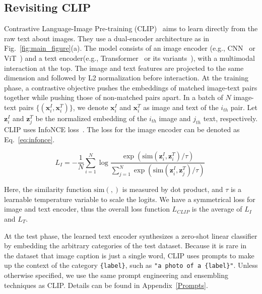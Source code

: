 \subsection{Revisiting CLIP}

Contrastive Language-Image Pre-training (CLIP)~\citep{radford2021learning} aims to learn directly from the raw text about images. They use a dual-encoder architecture as in Fig.~\ref{fig:main_figure}(a). 
The model consists of an image encoder (e.g., CNN~\citep{he2016deep} or ViT~\citep{dosovitskiy2020image}) and a text encoder(e.g., Transformer~\citep{vaswani2017attention} or its variants~\citep{radford2019language}), with a multimodal interaction at the top. 
The image and text features are projected to the same dimension and followed by L2 normalization before interaction.
At the training phase, a contrastive objective pushes the embeddings of matched image-text pairs together while pushing those of non-matched pairs apart. 
In a batch of $N$ image-text pairs ${\{(\bm x_i^I, \bm x_i^T)\}}$, we denote $\bm x_i^I$ and $\bm x_i^T$ as image and text of the $i_{th}$ pair. Let $\bm z_i^I$ and $\bm z_j^T$ be the normalized embedding of the $i_{th}$ image and $j_{th}$ text, respectively. CLIP uses InfoNCE loss~\citep{oord2018representation}. The loss for the image encoder can be denoted as Eq.~\ref{eq:infonce}.

\begin{equation}
\label{eq:infonce}
    L_I = - \frac{1}{N} \sum_{i=1}^{N} \log \frac{\exp(\mathrm{sim}(\bm z_i^I, \bm z_i^T)/\tau)}{\sum_{j=1}^{N}\exp(\mathrm{sim}(\bm z_i^I, \bm z_j^T)/\tau)}~
\end{equation}

Here, the similarity function $\mathrm{sim}(,)$ is measured by dot product, and $\tau$ is a learnable temperature variable to scale the logits. We have a symmetrical loss for image and text encoder, thus the overall loss function $L_{CLIP}$ is the average of $L_I$ and $L_T$.


At the test phase, the learned text encoder synthesizes a zero-shot linear classifier by embedding the arbitrary categories of the test dataset. Because it is rare in the dataset that image caption is just a single word, CLIP uses prompts to make up the context of the category \texttt{\{label\}}, such as \texttt{"a photo of a \{label\}"}. Unless otherwise specified, we use the same prompt engineering and ensembling techniques as CLIP. Details can be found in Appendix~\ref{Prompts}.

